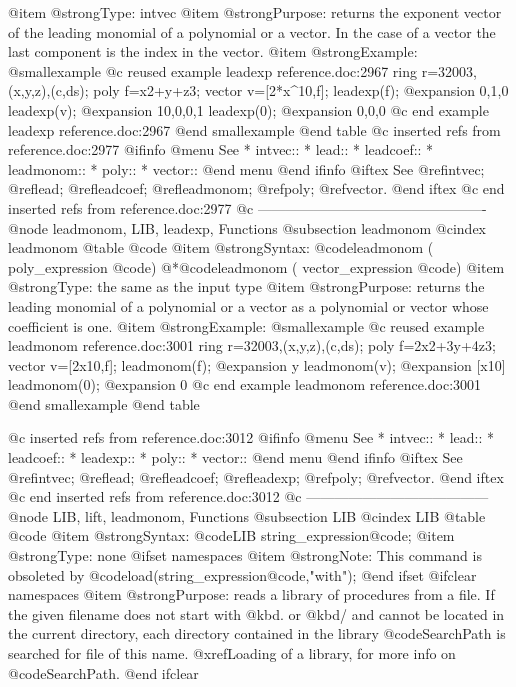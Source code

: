 {@item @strong{Type:}
intvec
@item @strong{Purpose:}
returns the exponent vector of the leading monomial of a polynomial or a vector.
In the case of a vector the last component is the index in the vector.
@item @strong{Example:}
@smallexample
@c reused example leadexp reference.doc:2967 
  ring r=32003,(x,y,z),(c,ds);
  poly f=x2+y+z3;
  vector v=[2*x^10,f];
  leadexp(f);
@expansion{} 0,1,0
  leadexp(v);
@expansion{} 10,0,0,1
  leadexp(0);
@expansion{} 0,0,0
@c end example leadexp reference.doc:2967
@end smallexample
@end table
@c inserted refs from reference.doc:2977
@ifinfo
@menu
See
* intvec::
* lead::
* leadcoef::
* leadmonom::
* poly::
* vector::
@end menu
@end ifinfo
@iftex
See
@ref{intvec};
@ref{lead};
@ref{leadcoef};
@ref{leadmonom};
@ref{poly};
@ref{vector}.
@end iftex
@c end inserted refs from reference.doc:2977
@c -------------------------------------------------
@node leadmonom, LIB, leadexp, Functions
@subsection leadmonom
@cindex leadmonom
@table @code
@item @strong{Syntax:}
@code{leadmonom (} poly_expression @code{)}
@*@code{leadmonom (} vector_expression @code{)}
@item @strong{Type:}
the same as the input type
@item @strong{Purpose:}
returns the leading monomial of a polynomial or a vector as a polynomial
or vector whose coefficient is one.
@item @strong{Example:}
@smallexample
@c reused example leadmonom reference.doc:3001 
  ring r=32003,(x,y,z),(c,ds);
  poly f=2x2+3y+4z3;
  vector v=[2x10,f];
  leadmonom(f);
@expansion{} y
  leadmonom(v);
@expansion{} [x10]
  leadmonom(0);
@expansion{} 0
@c end example leadmonom reference.doc:3001
@end smallexample
@end table

@c inserted refs from reference.doc:3012
@ifinfo
@menu
See
* intvec::
* lead::
* leadcoef::
* leadexp::
* poly::
* vector::
@end menu
@end ifinfo
@iftex
See
@ref{intvec};
@ref{lead};
@ref{leadcoef};
@ref{leadexp};
@ref{poly};
@ref{vector}.
@end iftex
@c end inserted refs from reference.doc:3012
@c ---------------------------------------
@node LIB, lift, leadmonom, Functions
@subsection LIB
@cindex LIB
@table @code
@item @strong{Syntax:}
@code{LIB} string_expression@code{;}
@item @strong{Type:}
none
@ifset namespaces
@item @strong{Note:}
This command is obsoleted by
@code{load(}string_expression@code{,"with");}
@end ifset
@ifclear namespaces
@item @strong{Purpose:}
reads a library of procedures from a file. If the given filename does
not start with @kbd{.} or @kbd{/} and cannot be located in the current
directory, each directory contained in the library
@code{SearchPath} is searched for file of this name.
@xref{Loading of a library}, for more info on @code{SearchPath}.
@end ifclear

}
